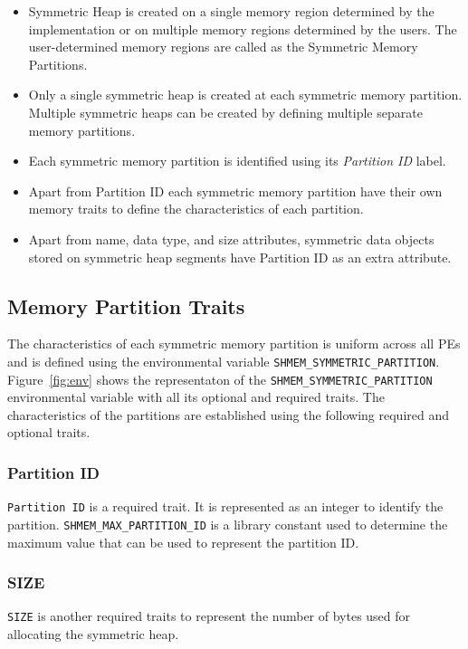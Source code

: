 \begin{itemize}
    \item Symmetric Heap is created on a single memory region
    determined by the implementation or on multiple memory regions
    determined by the users. The user-determined memory regions are
    called as the Symmetric Memory Partitions.
    \item Only a single symmetric heap is created at each symmetric
    memory partition. Multiple symmetric heaps can be created by
    defining multiple separate memory partitions.
    \item Each symmetric memory partition is identified using its
    \emph{Partition ID} label.
    \item Apart from Partition ID each symmetric memory partition
    have their own memory traits to define the characteristics of each
    partition.
    \item Apart from name, data type, and size attributes, symmetric
    data objects stored on symmetric heap segments have Partition ID
    as an extra attribute.
\end{itemize}

\subsection{Memory Partition Traits}
\label{src:smempart/traits}
The characteristics of each symmetric memory partition is uniform
across all PEs and is defined using the environmental variable
\texttt{SHMEM\_SYMMETRIC\_PARTITION}. Figure~\ref{fig:env} shows
the representaton of the \texttt{SHMEM\_SYMMETRIC\_PARTITION}
environmental variable with all its optional and required traits.
The characteristics of the partitions are established using the
following required and optional traits.

\subsubsection{Partition ID} \texttt{Partition ID} is a required
trait. It is represented as an integer to identify the partition.
\texttt{SHMEM\_MAX\_PARTITION\_ID} is a library constant used to
determine the maximum value that can be used to represent the
partition ID.

\subsubsection{SIZE} \texttt{SIZE} is another required traits to
represent the number of bytes used for allocating the symmetric
heap.

